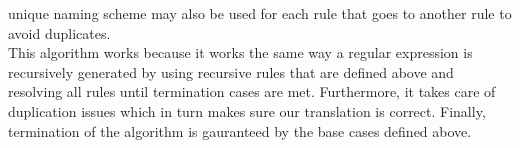 \documentclass [10pt]{article}
\begin{document}
\begin{enumerate}
unique naming scheme may also be used for each rule that goes to another rule to avoid duplicates.\\This algorithm works because it works the same way a regular expression is recursively generated by using recursive rules that are defined above and resolving all rules until termination cases are met. Furthermore, it takes care of duplication issues which in turn makes sure our translation is correct. Finally, termination of the algorithm is gauranteed by the base cases defined above.
\end{enumerate}
\end{document}
